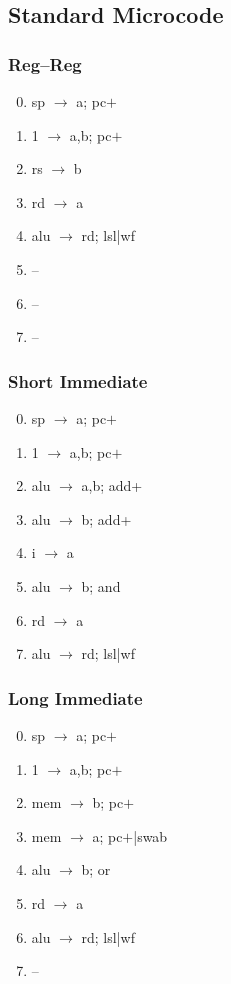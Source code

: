 \documentclass[11pt]{book}
\begin{document}
\subsection*{Standard Microcode}
\begin{multicols}{3}\ttfamily\selectfont\small
  \subsubsection*{Reg--Reg}
  \begin{enumerate}\setcounter{enumi}{-1}
  \item sp \(\rightarrow\) a; pc\(+\)
  \item 1 \(\rightarrow\) a,b; pc\(+\)
  \item rs \(\rightarrow\) b
  \item rd \(\rightarrow\) a
  \item alu \(\rightarrow\) rd; lsl|wf
  \item --
  \item --
  \item --
  \end{enumerate}
  \columnbreak
  \subsubsection*{Short Immediate}
  \begin{enumerate}\setcounter{enumi}{-1}
  \item sp \(\rightarrow\) a; pc\(+\)
  \item 1 \(\rightarrow\) a,b; pc\(+\)
  \item alu \(\rightarrow\) a,b; add+
  \item alu \(\rightarrow\) b; add+
  \item i \(\rightarrow\) a
  \item alu \(\rightarrow\) b; and
  \item rd \(\rightarrow\) a
  \item alu \(\rightarrow\) rd; lsl|wf
  \end{enumerate}
  \columnbreak
  \subsubsection*{Long Immediate}
  \begin{enumerate}\setcounter{enumi}{-1}
  \item sp \(\rightarrow\) a; pc\(+\)
  \item 1 \(\rightarrow\) a,b; pc\(+\)
  \item mem \(\rightarrow\) b; pc\(+\)
  \item mem \(\rightarrow\) a; pc\(+\)|swab
  \item alu \(\rightarrow\) b; or
  \item rd \(\rightarrow\) a
  \item alu \(\rightarrow\) rd; lsl|wf
  \item --
  \end{enumerate}
\end{multicols}
\end{document}
